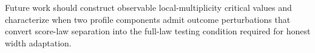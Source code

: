 Future work should construct observable local-multiplicity critical values and characterize when two profile components admit outcome perturbations that convert score-law separation into the full-law testing condition required for honest width adaptation.
